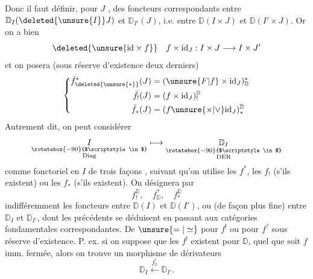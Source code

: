 Donc il faut définir, pour  $J$ , des foncteurs correspondants entre $\mathbb D_I(\deleted{\unsure{I}}J)$ et $\mathbb D_{I'}(J)$, i.e. entre $\mathbb D(I\times J)$ et $\mathbb D(I'\times J)$. Or on a bien
\[
\deleted{\unsure{\mathrm{id}\times f}} \quad f\times\mathrm{id}_J:I\times J\longrightarrow I\times J'
\]
et on posera (sous réserve d'existence  deux derniers)
\[
\left\{\begin{aligned}
\bar f^{*}_{\deleted{\unsure{*}}}(J)&=(\unsure{F|f}\times\mathrm{id}_J)^*_{\mathbb D}\\
\bar f_!(J)&=(f\times\mathrm{id}_J)^{\mathbb D}_!\\
\bar f_*(J)&=(f\unsure{\times|\vee}\mathrm{id}_J)^{\mathbb D}_*
\end{aligned}\right.
\]
Autrement dit, on peut considérer
\[
\underset{\substack{\rotatebox{-90}{$\scriptstyle\in$}\\\mathrm{Diag}}}{I}
\longmapsto
\underset{\substack{\rotatebox{-90}{$\scriptstyle\in$}\\\mathrm{DER}}}{\mathbb D_I}
\]
comme fonctoriel  en $I$ de trois façons , suivant qu'on utilise les $f^*$, les $f_!$ (s'ils existent) ou les $f_*$ (s'ils existent). On désignera par
\[
f^{\mathbb D}_!,\quad f^*_{\mathbb D},\quad f^{\mathbb D}_*
\]
indifféremment les foncteurs entre $\mathbb D(I)$ et $\mathbb D(I')$, ou (de façon plus fine) entre $\mathbb D_I$ et $\mathbb D_{I'}$, dont les précédents se déduisent en passant aux catégories fondamentales correspondantes. De $\unsure{=|\simeq}$ pour $f^!$ ou pour $f^?$ sous réserve d'existence. P. ex. si on suppose que les $f^!$ existent pour $\mathbb D$, quel que soit $f$ imm. fermée, alors on trouve  un morphisme de dérivateurs
\[
\mathbb D_I\xleftarrow{f^!_{\mathbb D}}\mathbb D_{I'}.
\]

